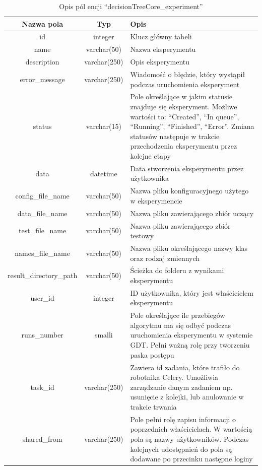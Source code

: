 \begin{table}[htb]
	\centering
	\begin{tabular}{|c|c|p{9cm}|}
		\hline
		\textbf{Nazwa pola} & \textbf{Typ} & \textbf{Opis} \\\hline
		id & integer & Klucz główny tabeli \\\hline
		name & varchar(50) & Nazwa eksperymentu\\\hline
		description & varchar(250) & Opis eksperymentu\\\hline
		error\_message & varchar(250) & Wiadomość o błędzie, który wystąpił podczas uruchomienia eksperyment\\\hline
		status & varchar(15) & Pole określające w jakim statusie znajduje się eksperyment. Możliwe wartości to: \enquote{Created}, \enquote{In queue}, \enquote{Running}, \enquote{Finished}, \enquote{Error}. Zmiana statusów następuje w trakcie przechodzenia eksperymentu przez kolejne etapy\\\hline
		data & datetime & Data stworzenia eksperymentu przez użytkownika\\\hline
		config\_file\_name & varchar(50) & Nazwa pliku konfiguracyjnego użytego w eksperymencie\\\hline
		data\_file\_name & varchar(50) & Nazwa pliku zawierającego zbiór uczący \\\hline
		test\_file\_name & varchar(50) & Nazwa pliku zawierającego zbiór testowy \\\hline
		names\_file\_name & varchar(50) & Nazwa pliku określającego nazwy klas oraz rodzaj zmiennych \\\hline
		result\_directory\_path & varchar(50) & Ścieżka do folderu z wynikami eksperymentu\\\hline
		user\_id & integer & ID użytkownika, który jest właścicielem eksperymentu \\\hline
		runs\_number & smalli & Pole określające ile przebiegów algorytmu ma się odbyć podczas uruchomienia eksperymentu w systemie GDT. Pełni ważną rolę przy tworzeniu paska postępu\\\hline
		task\_id & varchar(250) & Zawiera id zadania, które trafiło do robotnika Celery. Umożliwia zarządzanie danym zadaniem np. usunięcie z kolejki, lub anulowanie w trakcie trwania\\\hline
		shared\_from & varchar(250) & Pole pełni rolę zapisu informacji o poprzednich właścicielach. W wartością pola są nazwy użytkowników. Podczas kolejnych udostępnień do pola są dodawane po przecinku następne loginy  \\\hline
	\end{tabular}
	\caption[Opis pól encji \enquote{decisionTreeCore\_experiment}]{ Opis pól encji \enquote{decisionTreeCore\_experiment}}
	\label{tabela_1_schema_experiment}
\end{table}

